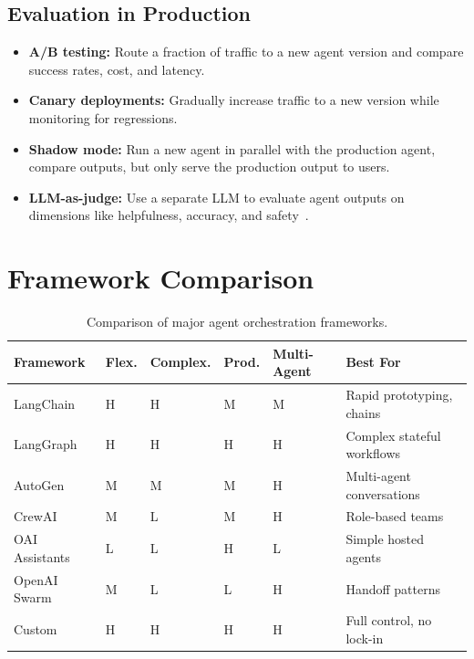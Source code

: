 \subsection{Evaluation in Production}
\label{evaluation-in-production}

\begin{itemize}
  \item \textbf{A/B testing:} Route a fraction of traffic to a new agent version and compare success rates, cost, and latency.
  \item \textbf{Canary deployments:} Gradually increase traffic to a new version while monitoring for regressions.
  \item \textbf{Shadow mode:} Run a new agent in parallel with the production agent, compare outputs, but only serve the production output to users.
  \item \textbf{LLM-as-judge:} Use a separate LLM to evaluate agent outputs on dimensions like helpfulness, accuracy, and safety~\cite{zheng2023judging}.
\end{itemize}

\section{Framework Comparison}
\label{subsec:framework-comparison}

\begin{table}[ht!]
\centering
\caption{Comparison of major agent orchestration frameworks.}
{\footnotesize
\begin{tabular}{@{}llllll@{}}
\toprule
\textbf{Framework} & \textbf{Flex.} & \textbf{Complex.} & \textbf{Prod.} & \textbf{Multi-Agent} & \textbf{Best For} \\
\midrule
LangChain & H & H & M & M & Rapid prototyping, chains \\
LangGraph & H & H & H & H & Complex stateful workflows \\
AutoGen & M & M & M & H & Multi-agent conversations \\
CrewAI & M & L & M & H & Role-based teams \\
OAI Assistants & L & L & H & L & Simple hosted agents \\
OpenAI Swarm & M & L & L & H & Handoff patterns \\
Custom & H & H & H & H & Full control, no lock-in \\
\bottomrule
\end{tabular}
}
\end{table}

